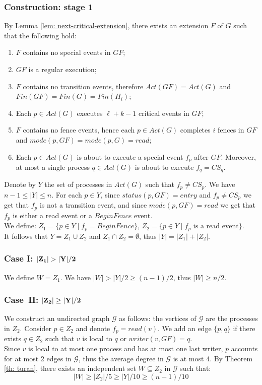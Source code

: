 \subsubsection{Construction: stage 1}
By Lemma \ref{lem: next-critical-extension}, there exists an extension $F$ of $G$ such that the following hold:
\begin{enumerate}
	\item $F$ contains no special events in $G F$;
	\item $G F$ is a regular execution;
	\item $F$ contains no transition events, therefore $Act(G F) = Act(G)$ and $Fin(G F) = Fin(G) = Fin(H_i)$;
	\item Each $p \in Act(G)$ executes $\ell+k-1$ critical events in $G F$;
	\item $F$ contains no fence events, hence each $p \in Act(G)$ completes $i$ fences in $G F$ and $mode(p,G F) = mode(p,G) = read$;
	\item Each $p \in Act(G)$ is about to execute a special event $f_p$ after $G F$. Moreover, at most a single process $q \in Act(G)$ is about to execute $f_q=CS_q$.
\end{enumerate}
Denote by $Y$ the set of processes in $Act(G)$ such that $f_p \neq CS_p$. We have $n-1 \leq |Y| \leq n$. For each $p \in Y$, since $status(p,G F) = entry$ and $f_p \neq CS_p$ we get that $f_p$ is not a transition event, and since $mode(p,G F) = read$ we get that $f_p$ is either a read event or a $BeginFence$ event.
\\ We define: $Z_1 = \{p \in Y \mid f_p = BeginFence\}$, $Z_2 = \{p \in Y \mid f_p \text{ is a read event}\}$.
\\ It follows that $Y = Z_1 \cup Z_2$ and $Z_1 \cap Z_2 = \emptyset$, thus $|Y|=|Z_1|+|Z_2|$.

\subsubsection*{\hspace{5mm} Case I: $\bf |Z_1| > |Y|/2$}
We define $W = Z_1$. We have $|W| > |Y|/2 \geq (n-1)/2$, thus $|W| \geq n/2$.

\subsubsection*{\hspace{5mm} Case\ II: $\bf |Z_2| \geq |Y|/2$}
We construct an undirected graph $\mathcal{G}$ as follows: the vertices of $\mathcal{G}$ are the processes in $Z_2$. Consider $p \in Z_2$ and denote $f_p = read(v)$. We add an edge $\{p,q\}$ if there exists $q \in Z_2$ such that $v$ is local to $q$ or $writer(v, G F) = q$.
\\ Since $v$ is local to at most one process and has at most one last writer, $p$ accounts for at most 2 edges in $\mathcal{G}$, thus the average degree in $\mathcal{G}$ is at most 4. By Theorem \ref{th: turan}, there exists an independent set $W \subseteq Z_2$ in $\mathcal{G}$ such that:
$$|W| \geq |Z_2|/5 \geq |Y|/10 \geq (n-1)/10$$

